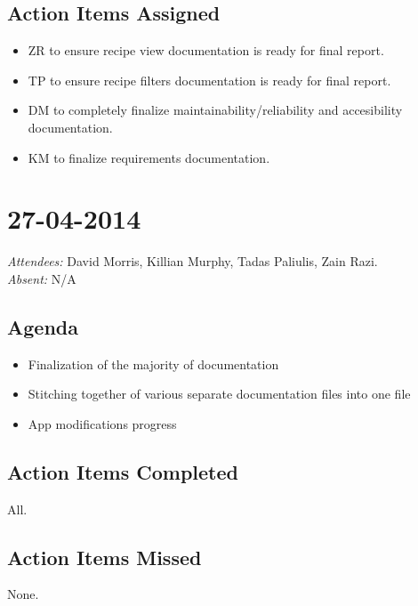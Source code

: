 \documentclass{article}
\begin{document}
\subsection*{Action Items Assigned}
\begin{itemize}
\item ZR to ensure recipe view documentation is ready for final report.
\item TP to ensure recipe filters documentation is ready for final report.
\item DM to completely finalize maintainability/reliability and accesibility documentation.
\item KM to finalize requirements documentation.
\end{itemize}

\section*{27-04-2014}
\vspace{0.5cm}
\emph{Attendees: }David Morris, Killian Murphy, Tadas Paliulis, Zain Razi.
\\
\emph{Absent: }N/A

\subsection*{Agenda}
\begin{itemize}
\item Finalization of the majority of documentation
\item Stitching together of various separate documentation files into one file
\item App modifications progress
\end{itemize}

\subsection*{Action Items Completed}
All.

\subsection*{Action Items Missed}
None.
\end{document}
